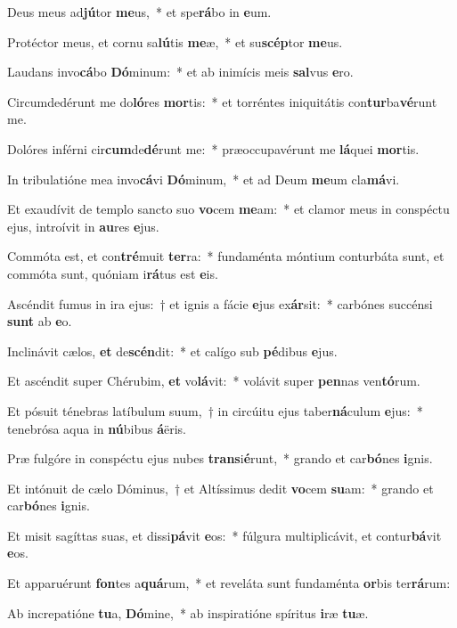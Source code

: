 \item Deus meus ad\textbf{jú}tor \textbf{me}us,~* et spe\textbf{rá}bo in \textbf{e}um.
\item Protéctor meus, et cornu sa\textbf{lú}tis \textbf{me}æ,~* et su\textbf{scép}tor \textbf{me}us.
\item Laudans invo\textbf{cá}bo \textbf{Dó}minum:~* et ab inimícis meis \textbf{sal}vus \textbf{e}ro.
\item Circumdedérunt me do\textbf{ló}res \textbf{mor}tis:~* et torréntes iniquitátis con\textbf{tur}ba\textbf{vé}runt me.
\item Dolóres inférni cir\textbf{cum}de\textbf{dé}runt me:~* præoccupavérunt me \textbf{lá}quei \textbf{mor}tis.
\item In tribulatióne mea invo\textbf{cá}vi \textbf{Dó}minum,~* et ad Deum \textbf{me}um cla\textbf{má}vi.
\item Et exaudívit de templo sancto suo \textbf{vo}cem \textbf{me}am:~* et clamor meus in conspéctu ejus, introívit in \textbf{au}res \textbf{e}jus.
\item Commóta est, et con\textbf{tré}muit \textbf{ter}ra:~* fundaménta móntium conturbáta sunt, et commóta sunt, quóniam i\textbf{rá}tus est \textbf{e}is.
\item Ascéndit fumus in ira ejus:~† et ignis a fácie \textbf{e}jus ex\textbf{ár}sit:~* carbónes succénsi \textbf{sunt} ab \textbf{e}o.
\item Inclinávit cælos, \textbf{et} de\textbf{scén}dit:~* et calígo sub \textbf{pé}dibus \textbf{e}jus.
\item Et ascéndit super Chérubim, \textbf{et} vo\textbf{lá}vit:~* volávit super \textbf{pen}nas ven\textbf{tó}rum.
\item Et pósuit ténebras latíbulum suum,~† in circúitu ejus taber\textbf{ná}culum \textbf{e}jus:~* tenebrósa aqua in \textbf{nú}bibus \textbf{á}ëris.
\item Præ fulgóre in conspéctu ejus nubes \textbf{trans}i\textbf{é}runt,~* grando et car\textbf{bó}nes \textbf{i}gnis.
\item Et intónuit de cælo Dóminus,~† et Altíssimus dedit \textbf{vo}cem \textbf{su}am:~* grando et car\textbf{bó}nes \textbf{i}gnis.
\item Et misit sagíttas suas, et dissi\textbf{pá}vit \textbf{e}os:~* fúlgura multiplicávit, et contur\textbf{bá}vit \textbf{e}os.
\item Et apparuérunt \textbf{fon}tes a\textbf{quá}rum,~* et reveláta sunt fundaménta \textbf{or}bis ter\textbf{rá}rum:
\item Ab increpatióne \textbf{tu}a, \textbf{Dó}mine,~* ab inspiratióne spíritus \textbf{i}ræ \textbf{tu}æ.
